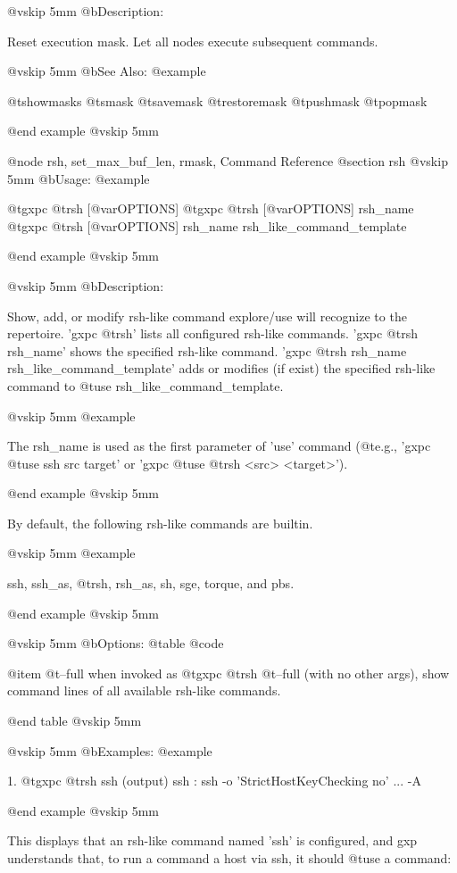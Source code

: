 @vskip 5mm
@b{Description:}


  Reset execution mask. Let all nodes execute subsequent commands.

@vskip 5mm
@b{See Also:}
@example

  @t{showmasks} @t{smask} @t{savemask} @t{restoremask} @t{pushmask} @t{popmask}

@end example
@vskip 5mm

@node rsh, set_max_buf_len, rmask, Command Reference
@section rsh
@vskip 5mm
@b{Usage:}
@example

  @t{gxpc} @t{rsh} [@var{OPTIONS}]
  @t{gxpc} @t{rsh} [@var{OPTIONS}] rsh_name
  @t{gxpc} @t{rsh} [@var{OPTIONS}] rsh_name rsh_like_command_template

@end example
@vskip 5mm

@vskip 5mm
@b{Description:}


  Show, add, or modify rsh-like command explore/use will recognize
  to the repertoire.
  'gxpc @t{rsh}' lists all configured rsh-like commands.
  'gxpc @t{rsh} rsh_name' shows the specified rsh-like command.
  'gxpc @t{rsh} rsh_name rsh_like_command_template' adds or modifies (if exist)
  the specified rsh-like command to @t{use} rsh_like_command_template.

@vskip 5mm
@example

  The rsh_name is used as the first parameter of 'use' command (@t{e}.g.,
  'gxpc @t{use} ssh src target' or 'gxpc @t{use} @t{rsh} <src> <target>').

@end example
@vskip 5mm

  By default, the following rsh-like commands are builtin.

@vskip 5mm
@example

  ssh, ssh_as, @t{rsh}, rsh_as, sh, sge, torque, and pbs.

@end example
@vskip 5mm

@vskip 5mm
@b{Options:}
@table @code

@item   @t{--full}
    when invoked as @t{gxpc} @t{rsh} @t{--full} (with no other args),
    show command lines of all available rsh-like commands.

@end table
@vskip 5mm

@vskip 5mm
@b{Examples:}
@example

1.
  @t{gxpc} @t{rsh} ssh
  (output) ssh : ssh -o 'StrictHostKeyChecking no' ... -A %

@end example
@vskip 5mm

  This displays that an rsh-like command named 'ssh' is configured,
  and gxp understands that, to run a command a host via ssh, it should
  @t{use} a command:

